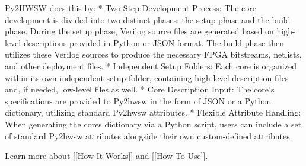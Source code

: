 Py2HWSW does this by:
* Two-Step Development Process: The core development is divided into two distinct phases: the setup phase and the build phase. During the setup phase, Verilog source files are generated based on high-level descriptions provided in Python or JSON format. The build phase then utilizes these Verilog sources to produce the necessary FPGA bitstreams, netlists, and other deployment files.
* Independent Setup Folders: Each core is organized within its own independent setup folder, containing high-level description files and, if needed, low-level files as well.
* Core Description Input: The core's specifications are provided to Py2hwsw in the form of JSON or a Python dictionary, utilizing standard Py2hwsw attributes.
* Flexible Attribute Handling: When generating the cores dictionary via a Python script, users can include a set of standard Py2hwsw attributes alongside their own custom-defined attributes.

Learn more about [[How It Works]] and [[How To Use]].
